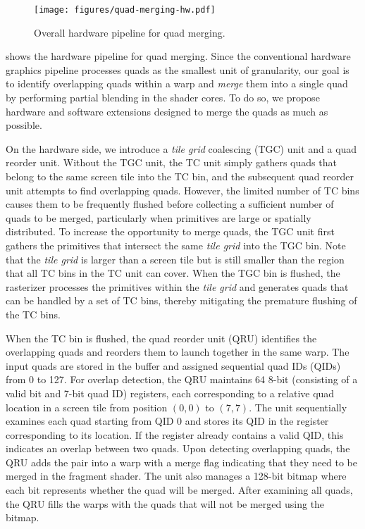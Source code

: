 \begin{figure}[t]
  \centering
  \texttt{[image: figures/quad-merging-hw.pdf]}
  \vspace{-0.03in}
  \caption{Overall hardware pipeline for quad merging.}
  \vspace{-0.19in}
  \label{fig:quad-merging-hw}
\end{figure}

 shows the hardware pipeline for quad merging. Since
the conventional hardware graphics pipeline processes quads as the smallest
unit of granularity, our goal is to identify overlapping quads within a warp
and \textit{merge} them into a single quad by performing partial blending in
the shader cores. To do so, we propose hardware and software extensions
designed to merge the quads as much as possible.

On the hardware side, we introduce a \emph{tile grid} coalescing (TGC) unit and
a quad reorder unit.
%
Without the TGC unit, the TC unit simply gathers quads that belong to the same
screen tile into the TC bin, and the subsequent quad reorder unit attempts to
find overlapping quads.
%
However, the limited number of TC bins causes them to be frequently flushed
before collecting a sufficient number of quads to be merged, particularly when
primitives are large or spatially distributed.
%
To increase the opportunity to merge quads, the TGC unit first gathers the
primitives that intersect the same \emph{tile grid} into the TGC bin. 
%
Note that the \emph{tile grid} is larger than a screen tile but is still
smaller than the region that all TC bins in the TC unit can cover.
%
When the TGC bin is flushed, the rasterizer processes the primitives within the
\emph{tile grid} and generates quads that can be handled by a set of TC bins,
thereby mitigating the premature flushing of the TC bins.

When the TC bin is flushed, the quad reorder unit (QRU) identifies the
overlapping quads and reorders them to launch together in the same warp.
%
The input quads are stored in the buffer and assigned sequential quad IDs
(QIDs) from 0 to 127.
%
For overlap detection, the QRU maintains 64 8-bit (consisting of a valid bit
and 7-bit quad ID) registers, each corresponding to a relative quad location in
a screen tile from position $(0,0)$ to $(7,7)$.
%
The unit sequentially examines each quad starting from QID 0 and stores its QID
in the register corresponding to its location.
%
If the register already contains a valid QID, this indicates an overlap between
two quads.
%
Upon detecting overlapping quads, the QRU adds the pair into a warp with a
merge flag indicating that they need to be merged in the fragment shader.
%
The unit also manages a 128-bit bitmap where each bit represents whether the
quad will be merged.
%
After examining all quads, the QRU fills the warps with the quads that will not
be merged using the bitmap.

